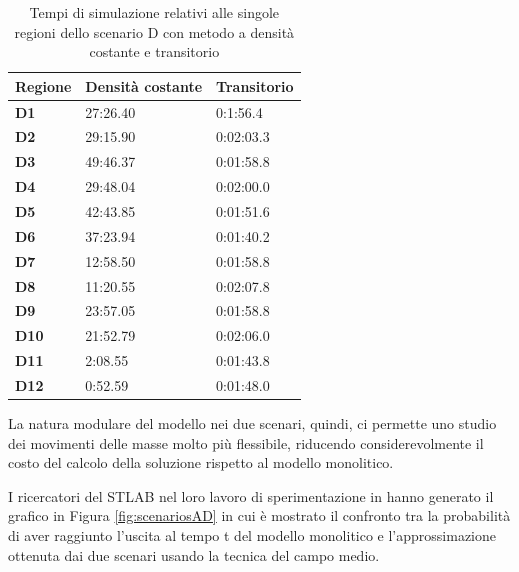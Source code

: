 \begin{table}[h]
  \centering
  \resizebox{0.7\textwidth}{!} {
 \begin{tabular}[t]{ |l|l|l| }
	 	\hline
	\textbf{Regione}	&		\textbf{Densità costante}	&		\textbf{Transitorio}	\\ \hline
	\textbf{D1} 		&		27:26.40				&		0:1:56.4			\\ \hline
	\textbf{D2}		&		29:15.90 				&		0:02:03.3		\\ \hline
	\textbf{D3}		 &		49:46.37 				&		0:01:58.8		\\ \hline
	\textbf{D4}		 &		29:48.04 				&		0:02:00.0			\\ \hline
	\textbf{D5}		 &		42:43.85 				&		0:01:51.6		\\ \hline
	\textbf{D6}		 &		37:23.94 				&		0:01:40.2		\\ \hline
	\textbf{D7}		 &		12:58.50 				&		0:01:58.8		\\ \hline
	\textbf{D8}		 &		11:20.55 				&		0:02:07.8		\\ \hline
	\textbf{D9}		 &		23:57.05 				&		0:01:58.8		\\ \hline
	\textbf{D10}	 &		21:52.79 				&		0:02:06.0		\\ \hline
	\textbf{D11}	 &		2:08.55 				&		0:01:43.8		\\ \hline
	\textbf{D12}	 &		0:52.59 				&		0:01:48.0		\\ \hline
	
	
  \end{tabular}
  
  }
  \caption{Tempi di simulazione relativi alle singole regioni dello scenario D con metodo a densità costante e transitorio}
  \label{tab:tabella-dati-simulazioni-D}
\end{table}
 
La natura modulare del modello nei due scenari, quindi, ci permette uno studio dei movimenti delle masse molto più flessibile, riducendo considerevolmente il costo del calcolo della soluzione rispetto al modello monolitico.

I ricercatori del STLAB nel loro lavoro di sperimentazione in \cite{esperimenti-sandro} hanno generato il grafico in Figura \ref{fig:scenariosAD} in cui è mostrato il confronto tra la probabilità di aver raggiunto l'uscita al tempo t del modello monolitico e l'approssimazione ottenuta dai due scenari usando la tecnica del campo medio.

